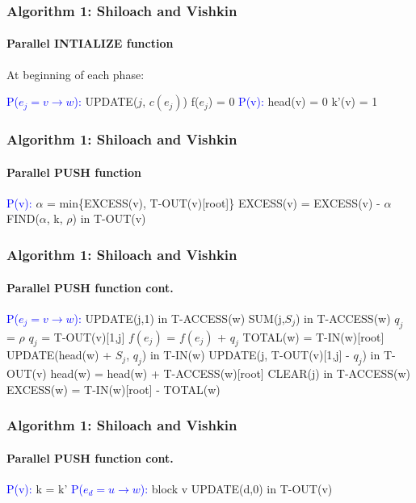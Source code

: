 \documentclass{beamer}
\begin{document}
\begin{frame}
\frametitle{Algorithm 1: Shiloach and Vishkin}
\framesubtitle{Parallel INTIALIZE function} 
At beginning of each phase:	
	\begin{algorithmic}[1]
		\State \textcolor{blue}{P($e_j = v \rightarrow w$):}
		\State UPDATE($j$, $c(e_j)$)
		\State f($e_j$) = 0
		\State \textcolor{blue}{P(v):}
		\State head(v) = 0	
		\State k'(v) = 1		
 	\EndFunction
	\end{algorithmic}
\end{frame}

\begin{frame}
\frametitle{Algorithm 1: Shiloach and Vishkin}
\framesubtitle{Parallel PUSH function} 
	\begin{algorithmic}[1]
		\State \textcolor{blue}{P(v):}
		\State $\alpha$ = min\{EXCESS(v), T-OUT(v)[root]\} 
		\State EXCESS(v) = EXCESS(v) - $\alpha$
		\State FIND($\alpha$, k, $\rho$) in T-OUT(v)
 	\EndFunction
	\end{algorithmic}
\end{frame}

\begin{frame}[shrink]
\frametitle{Algorithm 1: Shiloach and Vishkin}
\framesubtitle{Parallel PUSH function cont.} 
\begin{algorithmic}[1]
	\State \textcolor{blue}{P($e_j = v \rightarrow w$):}
 	\State UPDATE(j,1) in T-ACCESS(w)
	\State SUM(j,$S_j$) in T-ACCESS(w)
		$q_j$ = $\rho$
	\Else
		\State $q_j$ = T-OUT(v)[1,j]
	\EndIf
	\State $f(e_j)$ = $f(e_j)$ + $q_j$
	\State TOTAL(w) = T-IN(w)[root]
	\State UPDATE(head(w) + $S_j$, $q_j$) in T-IN(w)
	\State UPDATE(j, T-OUT(v)[1,j] - $q_j$) in T-OUT(v)
	\State head(w) = head(w) + T-ACCESS(w)[root] 
	\State CLEAR(j) in T-ACCESS(w)
	\State EXCESS(w) = T-IN(w)[root] - TOTAL(w)
	\EndIf
\end{algorithmic}
\end{frame}

\begin{frame}
\frametitle{Algorithm 1: Shiloach and Vishkin}
\framesubtitle{Parallel PUSH function cont.} 
\begin{algorithmic}[1]
	\State \textcolor{blue}{P(v):} k = k'
	\State \textcolor{blue}{P($e_d = u \rightarrow w$):}
		\State block v
		\State UPDATE(d,0) in T-OUT(v)
	\EndIf
\end{algorithmic}
\end{frame}
\end{document}
